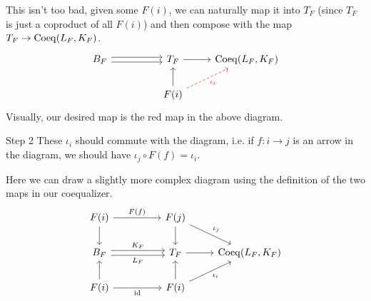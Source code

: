 \begin{solution}
\begin{solution}
    This isn't too bad, given some $F(i)$, we can naturally map it into $T_F$ (since $T_F$ is just a coproduct of all $F(i)$) and then compose with the map $T_F \to \mathrm{Coeq}(L_F, K_F)$.
    \[\begin{tikzcd}
	    {B_F} && {T_F} & {\Coeq(L_F, K_F)} \\
	    && {F(i)}
	    \arrow[shift right, from=1-1, to=1-3]
	    \arrow[shift left, from=1-1, to=1-3]
	    \arrow[from=1-3, to=1-4]
	    \arrow[from=2-3, to=1-3]
	    \arrow["{\iota_i}"', color=red, dashed, from=2-3, to=1-4]
    \end{tikzcd}\]
    Visually, our desired map is the red map in the above diagram.
    \end{solution}
    
    \begin{part}{Step 2}
        These $\iota_i$ should commute with the diagram, i.e. if $f : i \to j$ is an arrow in the diagram, we should have $\iota_j\circ F(f) = \iota_i$.
    \end{part}
    \begin{solution}

    Here we can draw a slightly more complex diagram using the definition of the two maps in our coequalizer.
    \[\begin{tikzcd}
	    {F(i)} && {F(j)} \\
	    {B_F} && {T_F} & {\Coeq(L_F, K_F)} \\
	    {F(i)} && {F(i)}
	    \arrow["{L_F}"', shift right, from=2-1, to=2-3]
	    \arrow["{K_F}", shift left, from=2-1, to=2-3]
	    \arrow[from=2-3, to=2-4]
	    \arrow[from=3-3, to=2-3]
	    \arrow["{\iota_i}"', from=3-3, to=2-4]
	    \arrow[from=3-1, to=2-1]
	    \arrow["{\textrm{id}}"', from=3-1, to=3-3]
	    \arrow["{F(f)}", from=1-1, to=1-3]
	    \arrow[from=1-1, to=2-1]
	    \arrow[from=1-3, to=2-3]
	    \arrow["{\iota_j}", from=1-3, to=2-4]
    \end{tikzcd}\]


\end{solution}
\end{solution}
